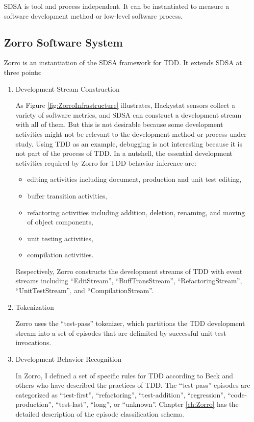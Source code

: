 SDSA is tool and process independent. It can be instantiated to measure a software development method or low-level software process.

\subsection{Zorro Software System}
Zorro is an instantiation of the SDSA framework for TDD. It extends SDSA at three points: 
\begin{enumerate}
\item Development Stream Construction

As Figure \ref{fig:ZorroInfrastructure} illustrates, Hackystat sensors collect a variety of software metrics, and SDSA can construct a development stream with all of them. But this is not desirable because some development activities might not be relevant to the development method or process under study. Using TDD as an example, debugging is not interesting because it is not part of the process of TDD. In a nutshell, the essential development activities required by Zorro for TDD behavior inference are:
\begin{itemize}
\item editing activities including document, production and unit test editing,
\item buffer transition activities,
\item refactoring activities including addition, deletion, renaming, and moving of object components,     
\item unit testing activities,
\item compilation activities. 
\end{itemize}
Respectively, Zorro constructs the development streams of TDD with event streams including ``EditStream'', ``BuffTransStream'', ``RefactoringStream'', ``UnitTestStream'', and ``CompilationStream''.  

\item Tokenization

Zorro uses the ``test-pass'' tokenizer, which partitions the TDD development stream into a set of episodes that are delimited by successful unit test invocations. 

\item Development Behavior Recognition  

In Zorro, I defined a set of specific rules for TDD according to Beck \cite{Beck:01,Beck:03} and others who have described the practices of TDD. The ``test-pass'' episodes are categorized as ``test-first'', ``refactoring'', ``test-addition'', ``regression'', ``code-production'', ``test-last'', ``long'', or ``unknown''. Chapter \ref{ch:Zorro} has the detailed description of the episode classification schema. 

\end{enumerate}


